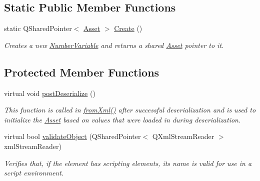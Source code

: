 \subsection*{Static Public Member Functions}
\begin{DoxyCompactItemize}
\item 
\hypertarget{class_picto_1_1_number_variable_a31393c261a291c97ddcac5424eba955e}{static Q\-Shared\-Pointer$<$ \hyperlink{class_picto_1_1_asset}{Asset} $>$ \hyperlink{class_picto_1_1_number_variable_a31393c261a291c97ddcac5424eba955e}{Create} ()}\label{class_picto_1_1_number_variable_a31393c261a291c97ddcac5424eba955e}

\begin{DoxyCompactList}\small\item\em Creates a new \hyperlink{class_picto_1_1_number_variable}{Number\-Variable} and returns a shared \hyperlink{class_picto_1_1_asset}{Asset} pointer to it. \end{DoxyCompactList}\end{DoxyCompactItemize}
\subsection*{Protected Member Functions}
\begin{DoxyCompactItemize}
\item 
virtual void \hyperlink{class_picto_1_1_number_variable_a6ab9b74741c023e43dab955a975cc6c4}{post\-Deserialize} ()
\begin{DoxyCompactList}\small\item\em This function is called in \hyperlink{class_picto_1_1_asset_a8bed4da09ecb1c07ce0dab313a9aba67}{from\-Xml()} after successful deserialization and is used to initialize the \hyperlink{class_picto_1_1_asset}{Asset} based on values that were loaded in during deserialization. \end{DoxyCompactList}\item 
\hypertarget{class_picto_1_1_number_variable_a4ee142237d5b7c7c35371225b6d464e0}{virtual bool \hyperlink{class_picto_1_1_number_variable_a4ee142237d5b7c7c35371225b6d464e0}{validate\-Object} (Q\-Shared\-Pointer$<$ Q\-Xml\-Stream\-Reader $>$ xml\-Stream\-Reader)}\label{class_picto_1_1_number_variable_a4ee142237d5b7c7c35371225b6d464e0}

\begin{DoxyCompactList}\small\item\em Verifies that, if the element has scripting elements, its name is valid for use in a script environment. \end{DoxyCompactList}\end{DoxyCompactItemize}
